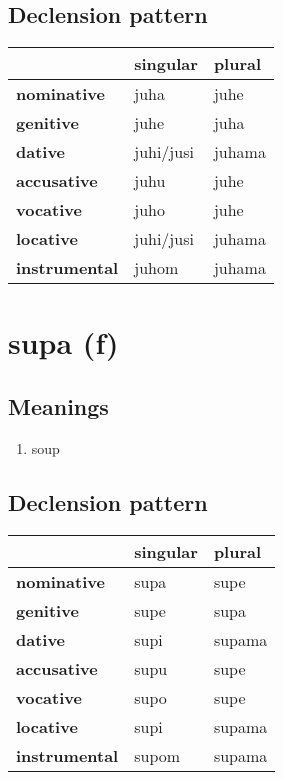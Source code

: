 \subsection*{Declension pattern}
\begin{tabularx}{\linewidth}{Xll}
\toprule
{} &   singular &  plural \\
\midrule
\textbf{nominative  } &       juha &    juhe \\
\textbf{genitive    } &       juhe &    juha \\
\textbf{dative      } &  juhi/jusi &  juhama \\
\textbf{accusative  } &       juhu &    juhe \\
\textbf{vocative    } &       juho &    juhe \\
\textbf{locative    } &  juhi/jusi &  juhama \\
\textbf{instrumental} &      juhom &  juhama \\
\bottomrule
\end{tabularx}

\filbreak
\section{supa (f)}
\subsection*{Meanings}
\begin{enumerate}
\item soup
\end{enumerate}
\subsection*{Declension pattern}
\begin{tabularx}{\linewidth}{Xll}
\toprule
{} & singular &  plural \\
\midrule
\textbf{nominative  } &     supa &    supe \\
\textbf{genitive    } &     supe &    supa \\
\textbf{dative      } &     supi &  supama \\
\textbf{accusative  } &     supu &    supe \\
\textbf{vocative    } &     supo &    supe \\
\textbf{locative    } &     supi &  supama \\
\textbf{instrumental} &    supom &  supama \\
\bottomrule
\end{tabularx}

